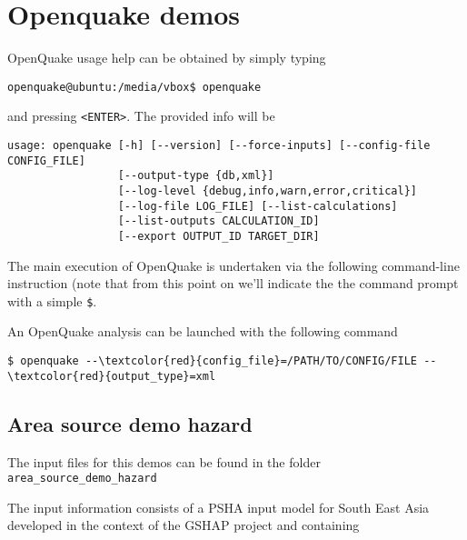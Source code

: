 \section{Openquake demos}
%
OpenQuake usage help can be obtained by simply typing
\begin{Verbatim}[frame=single, commandchars=\\\{\}, fontsize=\small]
openquake@ubuntu:/media/vbox$ openquake 
\end{Verbatim}
and pressing \texttt{<ENTER>}. The provided info will be 
\begin{Verbatim}[frame=single, commandchars=\\\{\}, fontsize=\small]
usage: openquake [-h] [--version] [--force-inputs] [--config-file CONFIG_FILE]
                 [--output-type {db,xml}]
                 [--log-level {debug,info,warn,error,critical}]
                 [--log-file LOG_FILE] [--list-calculations]
                 [--list-outputs CALCULATION_ID]
                 [--export OUTPUT_ID TARGET_DIR] 
\end{Verbatim}
The main execution of OpenQuake is undertaken via the following 
command-line instruction (note that from this point on we'll indicate the 
the command prompt with a simple \texttt{\$}.

An OpenQuake analysis can be launched with the following command
\begin{Verbatim}[frame=single, commandchars=\\\{\}, fontsize=\small]
$ openquake --\textcolor{red}{config_file}=/PATH/TO/CONFIG/FILE --\textcolor{red}{output_type}=xml
\end{Verbatim}

\subsection{Area source demo hazard}
%
The input files for this demos can be found in the folder 
\texttt{area\_source\_demo\_hazard}

The input information consists of a PSHA input model for South East Asia 
developed in the context of the GSHAP project and containing 

\cleardoublepage
